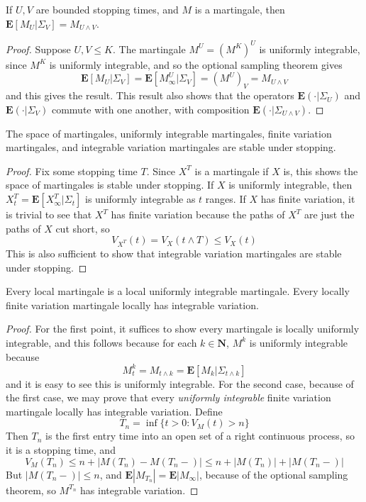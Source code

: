 \begin{lemma}
    If $U,V$ are bounded stopping times, and $M$ is a martingale, then $\mathbf{E}[M_U|\Sigma_V] = M_{U \wedge V}$.
\end{lemma}
\begin{proof}
    Suppose $U,V \leq K$. The martingale $M^U = (M^K)^U$ is uniformly integrable, since $M^K$ is uniformly integrable, and so the optional sampling theorem gives
    \[ \mathbf{E}[M_U|\Sigma_V] = \mathbf{E}[M^U_\infty | \Sigma_V] = (M^U)_V = M_{U \wedge V} \]
    and this gives the result. This result also shows that the operators $\mathbf{E}(\cdot | \Sigma_U)$ and $\mathbf{E}(\cdot | \Sigma_V)$ commute with one another, with composition $\mathbf{E}(\cdot | \Sigma_{U \wedge V})$.
\end{proof}

\begin{theorem}
    The space of martingales, uniformly integrable martingales, finite variation martingales, and integrable variation martingales are stable under stopping.
\end{theorem}
\begin{proof}
    Fix some stopping time $T$. Since $X^T$ is a martingale if $X$ is, this shows the space of martingales is stable under stopping. If $X$ is uniformly integrable, then $X^T_t = \mathbf{E}[X^T_\infty|\Sigma_t]$ is uniformly integrable as $t$ ranges. If $X$ has finite variation, it is trivial to see that $X^T$ has finite variation because the paths of $X^T$ are just the paths of $X$ cut short, so
    \[ V_{X^T}(t) = V_X(t \wedge T) \leq V_X(t) \]
    This is also sufficient to show that integrable variation martingales are stable under stopping.
\end{proof}

\begin{lemma}
    Every local martingale is a local uniformly integrable martingale. Every locally finite variation martingale locally has integrable variation.
\end{lemma}
\begin{proof}
    For the first point, it suffices to show every martingale is locally uniformly integrable, and this follows because for each $k \in \mathbf{N}$, $M^k$ is uniformly integrable because
    \[ M^k_t = M_{t \wedge k} = \mathbf{E}[M_k|\Sigma_{t \wedge k}] \]
    and it is easy to see this is uniformly integrable. For the second case, because of the first case, we may prove that every {\it uniformly integrable} finite variation martingale locally has integrable variation. Define
    \[ T_n = \inf \{ t > 0 : V_M(t) > n \} \]
    Then $T_n$ is the first entry time into an open set of a right continuous process, so it is a stopping time, and
    \[ V_M(T_n) \leq n + |M(T_n) - M(T_n-)| \leq n + |M(T_n)| + |M(T_n-)| \]
    But $|M(T_n-)| \leq n$, and $\mathbf{E} |M_{T_n}| = \mathbf{E} |M_\infty|$, because of the optional sampling theorem, so $M^{T_n}$ has integrable variation.
\end{proof}


